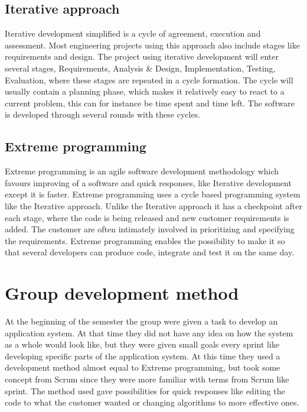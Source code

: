 \subsection{Iterative approach}
Iterative development simplified is a cycle of agreement, execution and assessment. Most engineering projects using this approach also include stages like requirements and design. The project using iterative development will enter several stages, Requirements, Analysis \& Design, Implementation, Testing, Evaluation, where these stages are repeated in a cycle formation. The cycle will usually contain a planning phase, which makes it relatively easy to react to a current problem, this can for instance be time spent and time left. The software is developed through several rounds with these cycles. 

\subsection{Extreme programming}
Extreme  programming is an agile software development methodology which favours improving of a software and quick responses, like Iterative development except it is faster. Extreme programming uses a cycle based programming system like the Iterative approach. Unlike the Iterative approach it has a checkpoint after each stage, where the code is being released and new customer requirements is added. The customer are often intimately involved in prioritizing and specifying the requirements. Extreme programming enables the possibility to make it so that several developers can produce code, integrate and test it on the same day.  



\section{Group development method} 
At the beginning of the semester the group were given a task to develop an application system. At that time they did not have any idea on how the system as a whole would look like, but they were given small goals every sprint like developing specific parts of the application system. At this time they used a development method almost equal to Extreme programming, but took some concept from Scrum since they were more familiar with terms from Scrum like sprint. The method used gave possibilities for quick responses like editing the code to what the customer wanted or changing algorithms to more effective ones.


